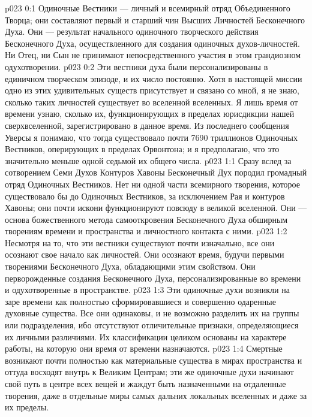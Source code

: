 \author{Божественный Советник}
\vs p023 0:1 Одиночные Вестники --- личный и всемирный отряд Объединенного Творца; они составляют первый и старший чин Высших Личностей Бесконечного Духа. Они --- результат начального одиночного творческого действия Бесконечного Духа, осуществленного для создания одиночных духов\hyp{}личностей. Ни Отец, ни Сын не принимают непосредственного участия в этом грандиозном одухотворении.
\vs p023 0:2 Эти вестники духа были персонализированы в единичном творческом эпизоде, и их число постоянно. Хотя в настоящей миссии одно из этих удивительных существ присутствует и связано со мной, я не знаю, сколько таких личностей существует во вселенной вселенных. Я лишь время от времени узнаю, сколько их, функционирующих в пределах юрисдикции нашей сверхвселенной, зарегистрировано в данное время. Из последнего сообщения Уверсы я понимаю, что тогда существовало почти 7690 триллионов Одиночных Вестников, оперирующих в пределах Орвонтона; и я предполагаю, что это значительно меньше одной седьмой их общего числа.
\vs p023 1:1 Сразу вслед за сотворением Семи Духов Контуров Хавоны Бесконечный Дух породил громадный отряд Одиночных Вестников. Нет ни одной части всемирного творения, которое существовало бы до Одиночных Вестников, за исключением Рая и контуров Хавоны; они почти искони функционируют повсюду в великой вселенной. Они --- основа божественного метода самооткровения Бесконечного Духа обширным творениям времени и пространства и личностного контакта с ними.
\vs p023 1:2 Несмотря на то, что эти вестники существуют почти изначально, все они осознают свое начало как личностей. Они осознают время, будучи первыми творениями Бесконечного Духа, обладающими этим свойством. Они перворожденные создания Бесконечного Духа, персонализированные во времени и одухотворенные в пространстве.
\vs p023 1:3 Эти одиночные духи возникли на заре времени как полностью сформировавшиеся и совершенно одаренные духовные существа. Все они одинаковы, и не возможно разделить их на группы или подразделения, ибо отсутствуют отличительные признаки, определяющиеся их личными различиями. Их классификации целиком основаны на характере работы, на которую они время от времени назначаются.
\vs p023 1:4 Смертные возникают почти полностью как материальные существа в мирах пространства и оттуда восходят внутрь к Великим Центрам; эти же одиночные духи начинают свой путь в центре всех вещей и жаждут быть назначенными на отдаленные творения, даже в отдельные миры самых дальних локальных вселенных и даже за их пределы.
